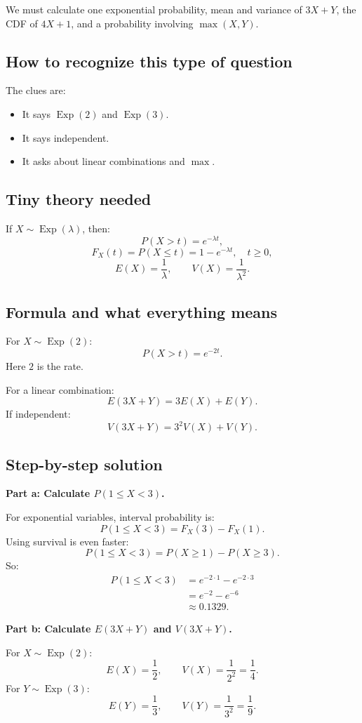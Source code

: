 \documentclass[11pt,a4paper]{article}
\begin{document}
We must calculate one exponential probability, mean and variance of \(3X+Y\), the CDF of \(4X+1\), and a probability involving \(\max(X,Y)\).

\subsection*{How to recognize this type of question}
The clues are:
\begin{itemize}[leftmargin=*]
    \item It says \(\operatorname{Exp}(2)\) and \(\operatorname{Exp}(3)\).
    \item It says independent.
    \item It asks about linear combinations and \(\max\).
\end{itemize}

\subsection*{Tiny theory needed}
If \(X\sim \operatorname{Exp}(\lambda)\), then:
\[
P(X>t)=e^{-\lambda t},
\]
\[
F_X(t)=P(X\le t)=1-e^{-\lambda t},\quad t\ge 0,
\]
\[
E(X)=\frac{1}{\lambda},\qquad V(X)=\frac{1}{\lambda^2}.
\]

\subsection*{Formula and what everything means}
For \(X\sim\operatorname{Exp}(2)\):
\[
P(X>t)=e^{-2t}.
\]
Here \(2\) is the rate.

For a linear combination:
\[
E(3X+Y)=3E(X)+E(Y).
\]
If independent:
\[
V(3X+Y)=3^2V(X)+V(Y).
\]

\subsection*{Step-by-step solution}
\textbf{Part a: Calculate \(P(1\le X<3)\).}

For exponential variables, interval probability is:
\[
P(1\le X<3)=F_X(3)-F_X(1).
\]
Using survival is even faster:
\[
P(1\le X<3)=P(X\ge 1)-P(X\ge 3).
\]
So:
\begin{align*}
P(1\le X<3)
&=e^{-2\cdot1}-e^{-2\cdot3}\\
&=e^{-2}-e^{-6}\\
&\approx 0.1329.
\end{align*}

\textbf{Part b: Calculate \(E(3X+Y)\) and \(V(3X+Y)\).}

For \(X\sim\operatorname{Exp}(2)\):
\[
E(X)=\frac{1}{2},\qquad V(X)=\frac{1}{2^2}=\frac{1}{4}.
\]
For \(Y\sim\operatorname{Exp}(3)\):
\[
E(Y)=\frac{1}{3},\qquad V(Y)=\frac{1}{3^2}=\frac{1}{9}.
\]
\end{document}
